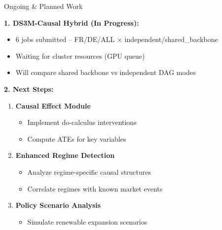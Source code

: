 \documentclass[aspectratio=169]{beamer}
\begin{document}
\begin{frame}{Ongoing \& Planned Work}

\textbf{1. DS3M-Causal Hybrid (In Progress):}
\begin{itemize}
    \item \textcolor{reprogreen}{6 jobs submitted} -- FR/DE/ALL $\times$ independent/shared\_backbone
    \item Waiting for cluster resources (GPU queue)
    \item Will compare shared backbone vs independent DAG modes
\end{itemize}

\vspace{0.2cm}
\textbf{2. Next Steps:}
\begin{enumerate}
    \item \textbf{Causal Effect Module}
    \begin{itemize}
        \item Implement do-calculus interventions
        \item Compute ATEs for key variables
    \end{itemize}

    \item \textbf{Enhanced Regime Detection}
    \begin{itemize}
        \item Analyze regime-specific causal structures
        \item Correlate regimes with known market events
    \end{itemize}

    \item \textbf{Policy Scenario Analysis}
    \begin{itemize}
        \item Simulate renewable expansion scenarios
    \end{itemize}
\end{enumerate}
\end{frame}
\end{document}
